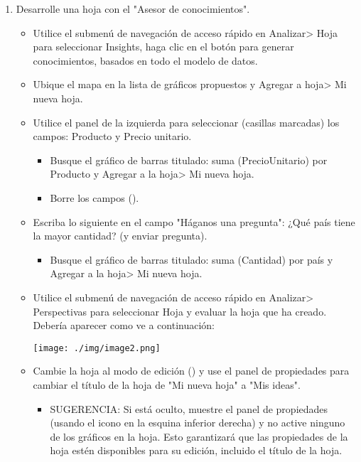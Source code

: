 \documentclass[12pt,letterpaper]{article}
\begin{document}
\begin{enumerate}
    \item Desarrolle una hoja con el "Asesor de conocimientos".\\
    \begin{itemize}
        \item Utilice el submenú de navegación de acceso rápido en Analizar> Hoja para seleccionar Insights, haga clic en el botón para generar conocimientos, basados en todo el modelo de datos.
        \item Ubique el mapa en la lista de gráficos propuestos y Agregar a hoja> Mi nueva hoja.
        \item Utilice el panel de la izquierda para seleccionar (casillas marcadas) los campos: Producto y Precio unitario.
        \begin{itemize}
            \item Busque el gráfico de barras titulado: suma (PrecioUnitario) por Producto y Agregar a la hoja> Mi nueva hoja.
            \item Borre los campos ().
        \end{itemize}
        \item Escriba lo siguiente en el campo "Háganos una pregunta": ¿Qué país tiene la mayor cantidad? (y enviar pregunta).
        \begin{itemize}
            \item Busque el gráfico de barras titulado: suma (Cantidad) por país y Agregar a la hoja> Mi nueva hoja.
        \end{itemize}
        \item Utilice el submenú de navegación de acceso rápido en Analizar> Perspectivas para seleccionar Hoja y evaluar la hoja que ha creado. Debería aparecer como ve a continuación:
        \begin{center}
            \texttt{[image: ./img/image2.png]} 
        \end{center}
        \item Cambie la hoja al modo de edición () y use el panel de propiedades para cambiar el título de la hoja de "Mi nueva hoja" a "Mis ideas".
        \begin{itemize}
            \item SUGERENCIA: Si está oculto, muestre el panel de propiedades (usando el icono en la esquina inferior derecha) y no active ninguno de los gráficos en la hoja. Esto garantizará que las propiedades de la hoja estén disponibles para su edición, incluido el título de la hoja.
        \end{itemize}

\end{itemize}
\end{enumerate}
\end{document}
